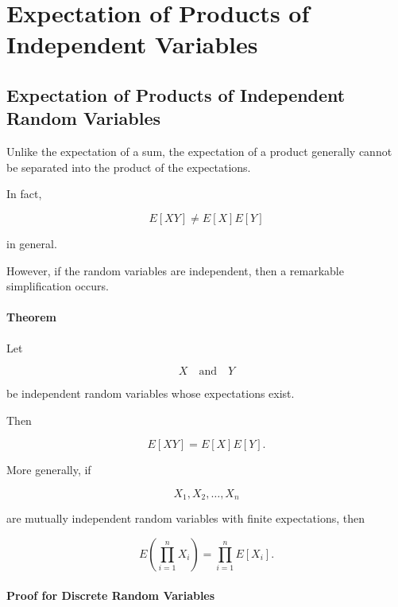 \documentclass[11pt]{article}
\begin{document}
	\section{Expectation of Products of Independent Variables}
	\begin{mdframed}[
		linewidth=0.8pt,
		roundcorner=6pt,
		backgroundcolor=gray!5,
		linecolor=gray!60,
		innertopmargin=10pt,
		innerbottommargin=10pt,
		innerleftmargin=10pt,
		innerrightmargin=10pt
		]
		
		\subsection*{Expectation of Products of Independent Random Variables}
		
		Unlike the expectation of a sum, the expectation of a product generally
		cannot be separated into the product of the expectations.
		
		In fact,
		
		\[
		E[XY]
		\neq
		E[X]E[Y]
		\]
		
		in general.
		
		However, if the random variables are independent, then a remarkable
		simplification occurs.
		
		\bigskip
		
		\paragraph{Theorem}
		
		Let
		
		\[
		X
		\quad\text{and}\quad
		Y
		\]
		
		be independent random variables whose expectations exist.
		
		Then
		
		\[
		\boxed{
			E[XY]
			=
			E[X]E[Y].
		}
		\]
		
		More generally, if
		
		\[
		X_1,X_2,\ldots,X_n
		\]
		
		are mutually independent random variables with finite expectations, then
		
		\[
		\boxed{
			E\!\left(
			\prod_{i=1}^{n}X_i
			\right)
			=
			\prod_{i=1}^{n}E[X_i].
		}
		\]
		
		\bigskip
		
		\paragraph{Proof for Discrete Random Variables}
		

\end{mdframed}
\end{document}
